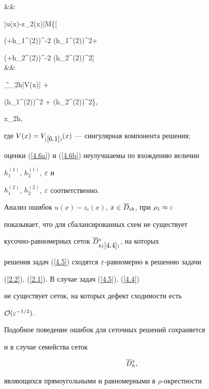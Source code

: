 %


&& \hspace*{-1cm} \no


|u(x)-z_2(x)|\le M\{[


(\eps+h_1^{(2)})^{-2} (h_1^{(2)})^2+


(\eps+h_2^{(2)})^{-2} (h_2^{(2)})^2]\times \\[1ex]


&& \label{4.6b}


\hspace*{3cm} 


\times \max\limits_{\G_{2h}}|V(x)| +


(h_1^{(2)})^2 + (h_2^{(2)})^2\}, \quad


x\in \Db_{2h}, \hspace*{1cm}


\eeq


\eeqs


где $V(x)=V_{(\ref{6.1})}(x)$ --- сингулярная компонента решения;


оценки (\ref{4.6a}) и (\ref{4.6b}) неулучшаемы по вхождению величин


$h_1^{(1)}$, $h_2^{(1)}$, $\varepsilon$ и


$h_1^{(2)}$, $h_2^{(2)}$, $\varepsilon$ соответственно.





Анализ ошибок $u(x)-z_i(x)$, $x\in \overline{D}_{ih}$, при $\rho_1\approx \varepsilon$


показывает, что для сбалансированных схем не существует


кусочно-равномерных сеток $\overline{D}{}^{*}_{h(\ref{4.4})}$, на которых


решения задач (\ref{4.5}) сходятся $\varepsilon$-равномерно к решению задачи


(\ref{2.2}), (\ref{2.1}). В случае задач (\ref{4.5}), (\ref{4.4})


не существует сеток, на которых дефект сходимости есть


${\cal O} (\varepsilon^{-1/2})$.


Подобное поведение ошибок для сеточных решений сохраняется


и в случае семейства сеток


\begin{equation} \label{4.7}


\Db{}_h^{*},


\end{equation}


являющихся прямоугольными и равномерными в $\rho$-окрестности


